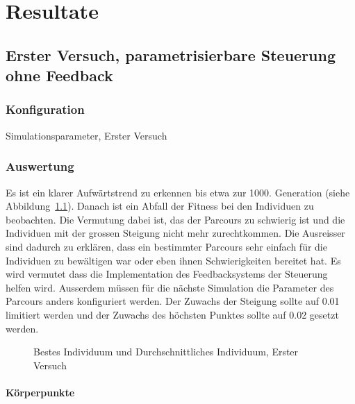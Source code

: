 %
%

\chapter{Resultate\label{chap:Resulate}}

\section{Erster Versuch, parametrisierbare Steuerung ohne Feedback}

  \subsection{Konfiguration}

    \begin{table}[H]
      
      \caption{Simulationsparameter, Erster Versuch}
    \end{table}

  \subsection{Auswertung}

    Es ist ein klarer Aufwärtstrend zu erkennen bis etwa zur 1000. Generation (siehe Abbildung~\ref{fig:graphFirst}).
    Danach ist ein Abfall der Fitness bei den Individuen zu beobachten.
    Die Vermutung dabei ist, das der Parcours zu schwierig ist und die Individuen
    mit der grossen Steigung nicht mehr zurechtkommen.
    Die Ausreisser sind dadurch zu erklären,
    dass ein bestimmter Parcours sehr einfach für die Individuen zu bewältigen war oder eben ihnen Schwierigkeiten bereitet hat.
    Es wird vermutet dass die Implementation des Feedbacksystems der Steuerung helfen wird.
    Ausserdem müssen für die nächste Simulation die Parameter des Parcours anders konfiguriert werden.
    Der Zuwachs der Steigung sollte auf 0.01 limitiert werden und der Zuwachs des höchsten Punktes
    sollte auf 0.02 gesetzt werden.

      \begin{figure}
        
        \caption{Bestes Individuum und Durchschnittliches Individuum, Erster Versuch\label{fig:graphFirst}}
      \end{figure}

    \subsubsection{Körperpunkte\label{subsub:bp}}

